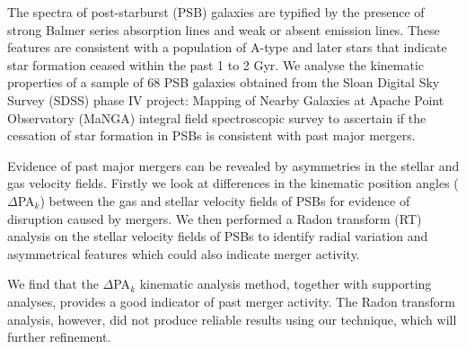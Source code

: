 
The spectra of post-starburst (PSB) galaxies are typified by the presence of strong Balmer series absorption lines and weak or absent emission lines. These features are consistent with a population of A-type and later stars that indicate star formation ceased within the past 1 to 2 Gyr. We analyse the kinematic properties of a sample of 68 PSB galaxies obtained from the Sloan Digital Sky Survey (SDSS) phase IV project: Mapping of Nearby Galaxies at Apache Point Observatory (MaNGA) integral field spectroscopic survey to ascertain if the cessation of star formation in PSBs is consistent with past major mergers. 

Evidence of past major mergers can be revealed by asymmetries in the stellar and gas velocity fields. Firstly we look at differences in the kinematic position angles ($\Delta$PA$_{k}$) between the gas and stellar velocity fields of PSBs for evidence of disruption caused by mergers. We then performed a Radon transform (RT) analysis on the stellar velocity fields of PSBs to identify radial variation and asymmetrical features which could also indicate merger activity. 

We find that the $\Delta$PA$_{k}$ kinematic analysis method, together with supporting analyses, provides a good indicator of past merger activity. The Radon transform analysis, however, did not produce reliable results using our technique, which will further refinement. 